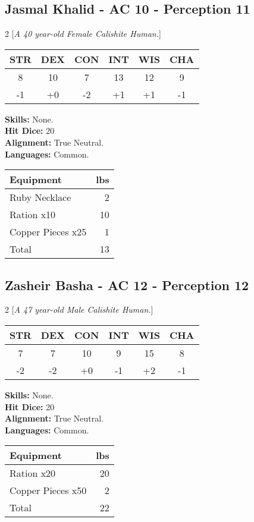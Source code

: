 \subsection*{Jasmal Khalid - AC 10 - Perception 11}
\begin{multicols}{2}
[\textit{A 40 year-old Female Calishite Human.}]
\begin{tabular}{cccccc}
 {STR}&
 {DEX}&
 {CON}&
 {INT}&
 {WIS}&
 {CHA}\\
\hline
8 & 10 & 7 & 13 & 12 & 9\\
-1 & +0 & -2 & +1 & +1 & -1
\end{tabular}
\textbf{Skills:} 
None.\\
\textbf{Hit Dice:} 20\\
\textbf{Alignment:} True Neutral.\\
\textbf{Languages:} 
Common.\\

\begin{tabular}{p{} r}
\textbf{Equipment} & lbs\\
\hline

Ruby Necklace & 2\\

Ration x10 & 10\\

Copper Pieces x25 & 1\\

\hline
Total & 13
\end{tabular}


\end{multicols}


\subsection*{Zasheir Basha - AC 12 - Perception 12}
\begin{multicols}{2}
[\textit{A 47 year-old Male Calishite Human.}]
\begin{tabular}{cccccc}
 {STR}&
 {DEX}&
 {CON}&
 {INT}&
 {WIS}&
 {CHA}\\
\hline
7 & 7 & 10 & 9 & 15 & 8\\
-2 & -2 & +0 & -1 & +2 & -1
\end{tabular}
\textbf{Skills:} 
None.\\
\textbf{Hit Dice:} 20\\
\textbf{Alignment:} True Neutral.\\
\textbf{Languages:} 
Common.\\

\begin{tabular}{p{} r}
\textbf{Equipment} & lbs\\
\hline

Ration x20 & 20\\

Copper Pieces x50 & 2\\

\hline
Total & 22
\end{tabular}


\end{multicols}


